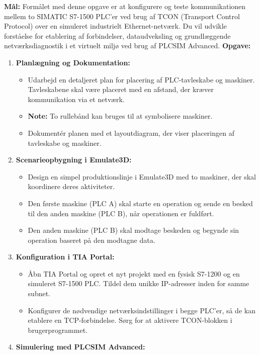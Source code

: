 \textbf{Mål:} Formålet med denne opgave er at konfigurere og teste kommunikationen mellem to SIMATIC S7-1500 PLC'er ved brug af TCON (Transport Control Protocol) over en simuleret industrielt Ethernet-netværk. Du vil udvikle forståelse for etablering af forbindelser, dataudveksling og grundlæggende netværksdiagnostik i et virtuelt miljø ved brug af PLCSIM Advanced.
\newline\newline
\noindent\textbf{Opgave:}
\begin{enumerate}
	\item \textbf{Planlægning og Dokumentation:}
	\begin{itemize}
		\item Udarbejd en detaljeret plan for placering af PLC-tavleskabe og maskiner. Tavleskabene skal være placeret med en afstand, der kræver kommunikation via et netværk.
		\item \textbf{Note:} To rullebånd kan bruges til at symbolisere maskiner.
		\item Dokumentér planen med et layoutdiagram, der viser placeringen af tavleskabe og maskiner.
	\end{itemize}
	\item \textbf{Scenarieopbygning i Emulate3D:}
	\begin{itemize}
		\item Design en simpel produktionslinje i Emulate3D med to maskiner, der skal koordinere deres aktiviteter.
		\item Den første maskine (PLC A) skal starte en operation og sende en besked til den anden maskine (PLC B), når operationen er fuldført.
		\item Den anden maskine (PLC B) skal modtage beskeden og begynde sin operation baseret på den modtagne data.
	\end{itemize}
	\item \textbf{Konfiguration i TIA Portal:}
	\begin{itemize}
		\item Åbn TIA Portal og opret et nyt projekt med en fysisk S7-1200 og en simuleret S7-1500 PLC. Tildel dem unikke IP-adresser inden for samme subnet.
		\item Konfigurer de nødvendige netværksindstillinger i begge PLC'er, så de kan etablere en TCP-forbindelse. Sørg for at aktivere TCON-blokken i brugerprogrammet.
	\end{itemize}
	\item \textbf{Simulering med PLCSIM Advanced:}
	\begin{itemize}

\end{itemize}
\end{enumerate}

